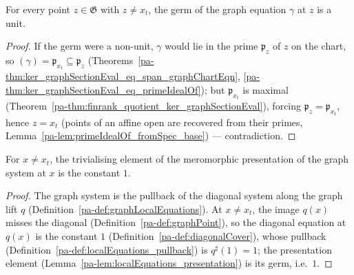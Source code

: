 \begin{lemma}
  \label{pa-lem:isUnit_germ_graphChartEqn_of_ne}
  \leanok

  For every point \(z \in \mathfrak G\) with \(z \neq x_t\), the germ of the graph equation
  \(\gamma\) at \(z\) is a unit.
\end{lemma}
\begin{proof}
  \leanok
  If the germ were a non-unit, \(\gamma\) would lie in the prime \(\mathfrak p_z\) of \(z\)
  on the chart, so \((\gamma) = \mathfrak p_{x_t} \subseteq \mathfrak p_z\)
  (Theorems~\ref{pa-thm:ker_graphSectionEval_eq_span_graphChartEqn},
  \ref{pa-thm:ker_graphSectionEval_eq_primeIdealOf}); but \(\mathfrak p_{x_t}\) is maximal
  (Theorem~\ref{pa-thm:finrank_quotient_ker_graphSectionEval}), forcing
  \(\mathfrak p_z = \mathfrak p_{x_t}\), hence \(z = x_t\) (points of an affine open are
  recovered from their primes, Lemma~\ref{pa-lem:primeIdealOf_fromSpec_base}) — contradiction.
\end{proof}

\begin{lemma}
  \label{pa-lem:presentationElem_graphLocalEquations_of_ne}
  \leanok

  For \(x \neq x_t\), the trivialising element of the meromorphic presentation of the graph
  system at \(x\) is the constant \(1\).
\end{lemma}
\begin{proof}
  \leanok
  The graph system is the pullback of the diagonal system along the graph lift \(q\)
  (Definition~\ref{pa-def:graphLocalEquations}). At \(x \neq x_t\), the image \(q(x)\) misses
  the diagonal (Definition~\ref{pa-def:graphPoint}), so the diagonal equation at \(q(x)\) is
  the constant \(1\) (Definition~\ref{pa-def:diagonalCover}), whose pullback
  (Definition~\ref{pa-def:localEquations_pullback}) is \(q^{\sharp}(1) = 1\); the presentation
  element (Lemma~\ref{pa-lem:localEquations_presentation}) is its germ, i.e.\ \(1\).
\end{proof}

